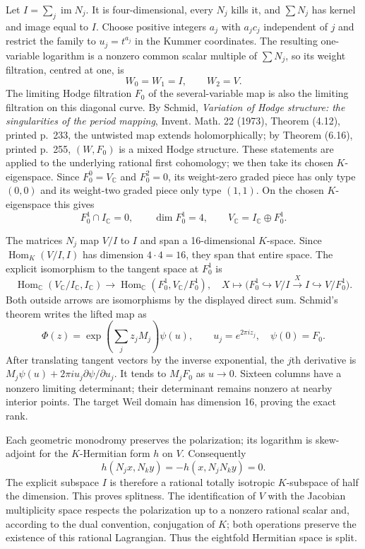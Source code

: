 Let $I=\sum_j\operatorname{im}N_j$. It is four-dimensional, every
$N_j$ kills it, and $\sum N_j$ has kernel and image equal to $I$.
Choose positive integers $a_j$ with $a_jc_j$ independent of $j$ and
restrict the family to $u_j=t^{a_j}$ in the Kummer coordinates.
The resulting one-variable logarithm is a nonzero common scalar
multiple of $\sum N_j$, so its weight filtration, centred at one, is
\[
W_0=W_1=I,\qquad W_2=V.
\]
The limiting Hodge filtration $F_0$ of the several-variable map
is also the limiting filtration on this diagonal curve. By Schmid,
\emph{Variation of Hodge structure: the singularities of the period
mapping}, Invent. Math. 22 (1973), Theorem (4.12), printed p.~233,
the untwisted map extends holomorphically; by Theorem (6.16),
printed p.~255, $(W,F_0)$ is a mixed Hodge structure.
These statements are applied to the underlying rational first cohomology;
we then take its chosen $K$-eigenspace.
Since $F_0^0=V_{\mathbb C}$ and $F_0^2=0$, its weight-zero graded piece
has only type $(0,0)$ and its weight-two graded piece only type $(1,1)$.
On the chosen $K$-eigenspace this gives
\[
F_0^1\cap I_{\mathbb C}=0,\qquad
\dim F_0^1=4,\qquad V_{\mathbb C}=I_{\mathbb C}\oplus F_0^1.
\]

The matrices $N_j$ map $V/I$ to $I$ and span a 16-dimensional
$K$-space. Since $\operatorname{Hom}_K(V/I,I)$ has dimension $4\cdot4=16$,
they span that entire space. The explicit isomorphism to the tangent
space at $F_0^1$ is
\[
\operatorname{Hom}_{\mathbb C}(V_{\mathbb C}/I_{\mathbb C},I_{\mathbb C})
\longrightarrow
\operatorname{Hom}_{\mathbb C}(F_0^1,V_{\mathbb C}/F_0^1),
\quad X\longmapsto \bigl(F_0^1\hookrightarrow V/I
\xrightarrow{X}I\hookrightarrow V/F_0^1\bigr).
\]
Both outside arrows are isomorphisms by the displayed direct sum.
Schmid's theorem writes the lifted map as
\[
\Phi(z)=\exp\!\left(\sum_j z_jM_j\right)\psi(u),
\qquad u_j=e^{2\pi iz_j},\quad\psi(0)=F_0.
\]
After translating tangent vectors by the inverse exponential, the
$j$th derivative is
$M_j\psi(u)+2\pi i u_j\partial\psi/\partial u_j$.
It tends to $M_jF_0$ as $u\to0$. Sixteen columns have a nonzero
limiting determinant; their determinant remains nonzero at nearby
interior points. The target Weil domain has dimension 16, proving
the exact rank.

Each geometric monodromy preserves the polarization; its logarithm is
skew-adjoint for the $K$-Hermitian form $h$ on $V$. Consequently
\[
h(N_jx,N_ky)=-h(x,N_jN_ky)=0.
\]
The explicit subspace $I$ is therefore a rational totally isotropic
$K$-subspace of half the dimension. This proves splitness. The
identification of $V$ with the Jacobian multiplicity space respects
the polarization up to a nonzero rational scalar and, according to
the dual convention, conjugation of $K$; both operations preserve the
existence of this rational Lagrangian. Thus the eightfold Hermitian
space is split.

